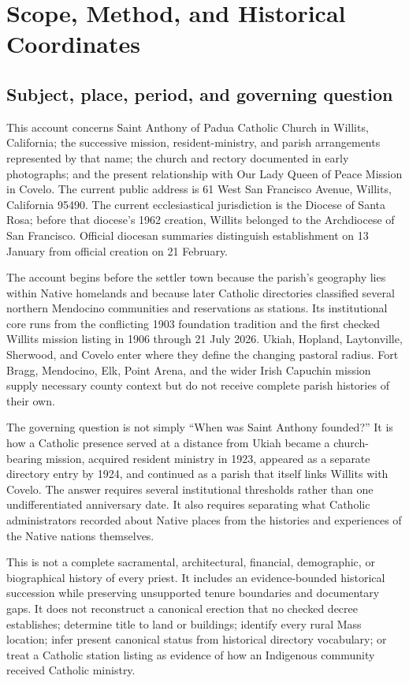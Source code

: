\section{Scope, Method, and Historical Coordinates}

\subsection{Subject, place, period, and governing question}

This account concerns Saint Anthony of Padua Catholic Church in Willits, California; the successive mission, resident-ministry, and parish arrangements represented by that name; the church and rectory documented in early photographs; and the present relationship with Our Lady Queen of Peace Mission in Covelo. The current public address is 61 West San Francisco Avenue, Willits, California 95490. The current ecclesiastical jurisdiction is the Diocese of Santa Rosa; before that diocese's 1962 creation, Willits belonged to the Archdiocese of San Francisco. Official diocesan summaries distinguish establishment on 13 January from official creation on 21 February.

The account begins before the settler town because the parish's geography lies within Native homelands and because later Catholic directories classified several northern Mendocino communities and reservations as stations. Its institutional core runs from the conflicting 1903 foundation tradition and the first checked Willits mission listing in 1906 through 21 July 2026. Ukiah, Hopland, Laytonville, Sherwood, and Covelo enter where they define the changing pastoral radius. Fort Bragg, Mendocino, Elk, Point Arena, and the wider Irish Capuchin mission supply necessary county context but do not receive complete parish histories of their own.

The governing question is not simply ``When was Saint Anthony founded?'' It is how a Catholic presence served at a distance from Ukiah became a church-bearing mission, acquired resident ministry in 1923, appeared as a separate directory entry by 1924, and continued as a parish that itself links Willits with Covelo. The answer requires several institutional thresholds rather than one undifferentiated anniversary date. It also requires separating what Catholic administrators recorded about Native places from the histories and experiences of the Native nations themselves.

This is not a complete sacramental, architectural, financial, demographic, or biographical history of every priest. It includes an evidence-bounded historical succession while preserving unsupported tenure boundaries and documentary gaps. It does not reconstruct a canonical erection that no checked decree establishes; determine title to land or buildings; identify every rural Mass location; infer present canonical status from historical directory vocabulary; or treat a Catholic station listing as evidence of how an Indigenous community received Catholic ministry.

